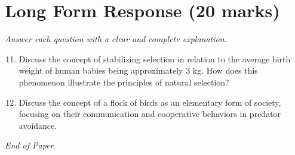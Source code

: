 \documentclass[12pt]{article}
\begin{document}
\section*{Long Form Response (20 marks)}
\textit{Answer each question with a clear and complete explanation.}
\begin{enumerate}[label=\arabic*.]
\setcounter{enumi}{10}
\item Discuss the concept of stabilizing selection in relation to the average birth weight of human babies being approximately 3 kg. How does this phenomenon illustrate the principles of natural selection?
\item Discuss the concept of a flock of birds as an elementary form of society, focusing on their communication and cooperative behaviors in predator avoidance.
\end{enumerate}

\vfill
\noindent\textit{End of Paper}
\end{document}
